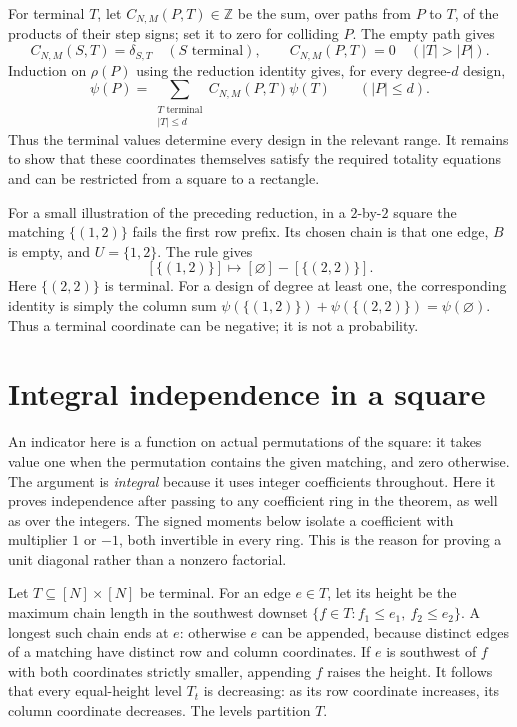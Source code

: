 \documentclass[11pt,a4paper,oneside,openany]{book}
\theoremstyle{definition}\newtheorem{definition}[theorem]{Definition}
\theoremstyle{remark}\newtheorem{remark}[theorem]{Remark}
\numberwithin{equation}{chapter}
\begin{document}
For terminal $T$, let $C_{N,M}(P,T)\in\mathbb Z$ be the sum, over paths
from $P$ to $T$, of the products of their step signs; set it to zero for
colliding $P$.  The empty path gives
\[
 C_{N,M}(S,T)=\delta_{S,T}\quad(S\text{ terminal}),\qquad
 C_{N,M}(P,T)=0\quad(|T|>|P|).
\]
Induction on $\rho(P)$ using the reduction identity gives, for every
degree-$d$ design,
\begin{equation}\label{tx:eq:terminal-expansion}
 \psi(P)=\sum_{\substack{T\text{ terminal}\\|T|\leq d}}
              C_{N,M}(P,T)\psi(T)\qquad(|P|\leq d).
\end{equation}
Thus the terminal values determine every design in the relevant range.
It remains to show that these coordinates themselves satisfy the required
totality equations and can be restricted from a square to a rectangle.

For a small illustration of the preceding reduction, in a $2$-by-$2$
square the matching $\{(1,2)\}$ fails the first row prefix. Its chosen
chain is that one edge, $B$ is empty, and $U=\{1,2\}$. The rule gives
\[
 [\{(1,2)\}]\longmapsto[\varnothing]-[\{(2,2)\}].
\]
Here $\{(2,2)\}$ is terminal. For a design of degree at least one,
the corresponding identity is simply the column sum $\psi(\{(1,2)\})+\psi(\{(2,2)\})=\psi(\varnothing)$.
Thus a terminal coordinate can be negative; it is not a probability.

\section{Integral independence in a square}
An indicator here is a function on actual permutations of the square:
it takes value one when the permutation contains the given matching,
and zero otherwise. The argument is \emph{integral} because it uses
integer coefficients throughout. Here it proves independence after
passing to any coefficient ring in the theorem, as well as over
the integers. The signed moments below isolate a coefficient
with multiplier $1$ or $-1$, both invertible in every ring. This is the
reason for proving a unit diagonal rather than a nonzero factorial.


Let $T\subseteq[N]\times[N]$ be terminal.  For an edge $e\in T$, let
its height be the maximum chain length in the southwest downset
$\{f\in T:f_1\leq e_1,\ f_2\leq e_2\}$.  A longest such chain ends
at $e$: otherwise $e$ can be appended, because distinct edges of a
matching have distinct row and column coordinates.  If $e$ is southwest
of $f$ with both coordinates strictly smaller, appending $f$ raises the
height.  It follows that every equal-height level $T_t$ is decreasing:
as its row coordinate increases, its column coordinate decreases.
The levels partition $T$.
\end{document}
